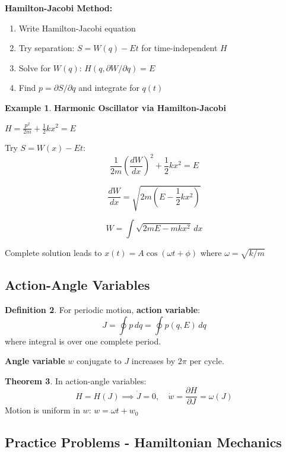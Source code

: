 \documentclass[12pt,a4paper]{article}
\theoremstyle{definition}
\newtheorem{theorem}{Theorem}[section]
\newtheorem{definition}[theorem]{Definition}
\newtheorem{example}[theorem]{Example}
\begin{document}
\begin{tipbox}
\textbf{Hamilton-Jacobi Method:}
\begin{enumerate}
    \item Write Hamilton-Jacobi equation
    \item Try separation: $S = W(q) - Et$ for time-independent $H$
    \item Solve for $W(q)$: $H(q, \partial W/\partial q) = E$
    \item Find $p = \partial S/\partial q$ and integrate for $q(t)$
\end{enumerate}
\end{tipbox}

\begin{example}
\textbf{Harmonic Oscillator via Hamilton-Jacobi}

$H = \frac{p^2}{2m} + \frac{1}{2}kx^2 = E$

Try $S = W(x) - Et$:
\[
\frac{1}{2m}\left(\frac{dW}{dx}\right)^2 + \frac{1}{2}kx^2 = E
\]

\[
\frac{dW}{dx} = \sqrt{2m(E - \frac{1}{2}kx^2)}
\]

\[
W = \int \sqrt{2mE - mkx^2}\, dx
\]

Complete solution leads to $x(t) = A\cos(\omega t + \phi)$ where $\omega = \sqrt{k/m}$
\end{example}

\subsection{Action-Angle Variables}

\begin{definition}
For periodic motion, \textbf{action variable}:
\[
J = \oint p\, dq = \oint p(q, E)\, dq
\]
where integral is over one complete period.

\textbf{Angle variable} $w$ conjugate to $J$ increases by $2\pi$ per cycle.
\end{definition}

\begin{theorem}
In action-angle variables:
\[
H = H(J) \implies \dot{J} = 0, \quad \dot{w} = \frac{\partial H}{\partial J} = \omega(J)
\]
Motion is uniform in $w$: $w = \omega t + w_0$
\end{theorem}

\subsection{Practice Problems - Hamiltonian Mechanics}
\end{document}

